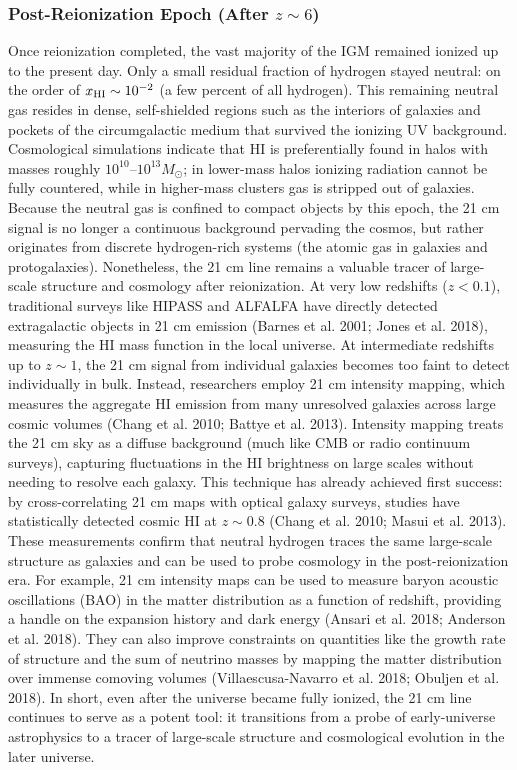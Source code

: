 \documentclass[floats,floatfix,showpacs,amssymb,prd,superscriptaddress,nofootinbib]{revtex4-2} %
\begin{document}
\subsubsection{Post-Reionization Epoch (After $z \sim 6$)}
Once reionization completed, the vast majority of the IGM remained ionized up to the present day. Only a small residual fraction of hydrogen stayed neutral: on the order of $x_{\rm HI} \sim 10^{-2}$ (a few percent of all hydrogen). This remaining neutral gas resides in dense, self-shielded regions such as the interiors of galaxies and pockets of the circumgalactic medium that survived the ionizing UV background. Cosmological simulations indicate that HI is preferentially found in halos with masses roughly $10^{10}$–$10^{13} M_\odot$; in lower-mass halos ionizing radiation cannot be fully countered, while in higher-mass clusters gas is stripped out of galaxies. Because the neutral gas is confined to compact objects by this epoch, the 21 cm signal is no longer a continuous background pervading the cosmos, but rather originates from discrete hydrogen-rich systems (the atomic gas in galaxies and protogalaxies). Nonetheless, the 21 cm line remains a valuable tracer of large-scale structure and cosmology after reionization. At very low redshifts ($z<0.1$), traditional surveys like HIPASS and ALFALFA have directly detected extragalactic objects in 21 cm emission (Barnes et al. 2001; Jones et al. 2018), measuring the HI mass function in the local universe. At intermediate redshifts up to $z\sim1$, the 21 cm signal from individual galaxies becomes too faint to detect individually in bulk. Instead, researchers employ 21 cm intensity mapping, which measures the aggregate HI emission from many unresolved galaxies across large cosmic volumes (Chang et al. 2010; Battye et al. 2013). Intensity mapping treats the 21 cm sky as a diffuse background (much like CMB or radio continuum surveys), capturing fluctuations in the HI brightness on large scales without needing to resolve each galaxy. This technique has already achieved first success: by cross-correlating 21 cm maps with optical galaxy surveys, studies have statistically detected cosmic HI at $z\sim0.8$ (Chang et al. 2010; Masui et al. 2013). These measurements confirm that neutral hydrogen traces the same large-scale structure as galaxies and can be used to probe cosmology in the post-reionization era. For example, 21 cm intensity maps can be used to measure baryon acoustic oscillations (BAO) in the matter distribution as a function of redshift, providing a handle on the expansion history and dark energy (Ansari et al. 2018; Anderson et al. 2018). They can also improve constraints on quantities like the growth rate of structure and the sum of neutrino masses by mapping the matter distribution over immense comoving volumes (Villaescusa-Navarro et al. 2018; Obuljen et al. 2018). In short, even after the universe became fully ionized, the 21 cm line continues to serve as a potent tool: it transitions from a probe of early-universe astrophysics to a tracer of large-scale structure and cosmological evolution in the later universe.
\end{document}
